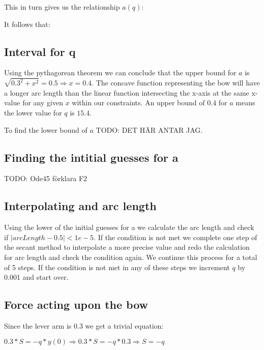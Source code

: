 \begin{center}
        
\end{center}

This in turn gives us the relationship $a(q)$:

\begin{center}
    
\end{center}

It follows that:

\begin{center}
    
\end{center}

\subsection{Interval for q}
Using the pythagorean theorem we can conclude that the upper bound for $a$ is $\sqrt{0.3^2+x^2}=0.5 \Rightarrow x=0.4$. The concave function representing the bow will have a longer arc length than the linear function intersecting the x-axis at the same x-value for any given $x$ within our constraints. An upper bound of $0.4$ for $a$ means the lower value for $q$ is $15.4$. 

To find the lower bound of $a$ TODO: DET HÄR ANTAR JAG.

\subsection{Finding the intitial guesses for a}
TODO: Ode45 förklara F2


\subsection{Interpolating and arc length}
Using the lower of the initial guesses for a we calculate the arc length and check if $|arcLength-0.5| < 1e-5$. If the condition is not met we complete one step of the secant method to interpolate a more precise value and redo the calculation for arc length and check the condition again. We continue this process for a total of 5 steps. If the condition is not met in any of these steps we increment $q$ by 0.001 and start over.

\subsection{Force acting upon the bow}
Since the lever arm is 0.3 we get a trivial equation:

$0.3*S=-q*y(0) \Rightarrow 0.3*S=-q*0.3 \Rightarrow S=-q$